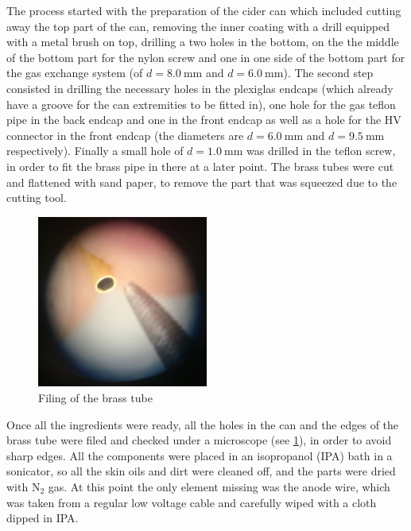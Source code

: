 The process started with the preparation of the cider can which included cutting
away the top part of the can, removing the inner coating with a drill equipped with a
metal brush on top, drilling a two holes in the bottom, on the the middle of the
bottom part for the nylon screw and one in one side of the bottom part for the
gas exchange system (of $d = \SI{8.0}{\milli\meter}$ and $d =
\SI{6.0}{\milli\meter}$). The second step consisted in drilling the necessary
holes in the plexiglas endcaps (which already have a groove for the can
extremities to be fitted in), one hole for the gas teflon pipe in the back
endcap and one in the front endcap as well as a hole for the HV connector in the
front endcap (the diameters are $d = \SI{6.0}{\milli\meter}$ and $d =
\SI{9.5}{\milli\meter}$ respectively). Finally a small hole of $d =
\SI{1.0}{\milli\meter}$ was drilled in the teflon screw, in order to fit the
brass pipe in there at a later point. The brass tubes were cut and flattened
with sand paper, to remove the part that was squeezed due to the cutting tool.

\begin{figure}[h]
  \centering
  \includegraphics[width=0.5\textwidth]{./graphics/brass_file.jpg}
  \caption{Filing of the brass tube}
  \label{fig:brass_file}
\end{figure}


Once all the ingredients were ready, all the holes in the can and the edges of
the brass tube were filed and checked under a microscope (see \ref{fig:brass_file}), in order to avoid
sharp edges. All the components were placed in an isopropanol (IPA) bath in a
sonicator, so all the skin oils and dirt were cleaned off, and the parts were
dried with $\mathrm{N}_2$ gas. At this point the only element missing was the
anode wire, which was taken from a regular low voltage cable and carefully wiped
with a cloth dipped in IPA.


